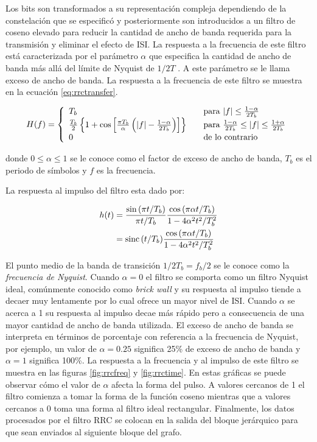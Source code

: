 Los bits son transformados a su representaci\'on compleja dependiendo de la constelaci\'on que se
especific\'o y posteriormente son introducidos a un filtro de coseno elevado para
reducir la cantidad de ancho de banda requerida para la transmisi\'on y eliminar el efecto de ISI. La respuesta a la frecuencia
de este filtro est\'a caracterizada por el par\'ametro $\alpha$ que especifica la cantidad de ancho de banda m\'as all\'a del
l\'imite de Nyquist de $1/2T$ \cite{sklar}. A este par\'ametro se le llama exceso de ancho de banda. La
respuesta a la frecuencia de este filtro se muestra en la ecuaci\'on \eqref{eq:rrctransfer}.

\begin{equation}\label{eq:rrctransfer}
H(f)=\left\{
\begin{array}{l l}
T_b & \quad \text{para $|f| \leq \frac{1-\alpha}{2T_b}$}\\
\frac{T_b}{2}\left\{1+\cos{\left[\frac{\pi
T_b}{\alpha}\left(|f|-\frac{1-\alpha}{2T_b}\right)\right]}\right\} & \quad \text{para
$\frac{1-\alpha}{2T_b} \leq |f| \leq \frac{1+\alpha}{2T_b}$}\\ 0 & \quad \text{de lo contrario} 
\end{array}\right.
\end{equation}

donde $0 \leq \alpha \leq 1$ se le conoce como el factor de exceso de ancho de banda, $T_b$ es el
periodo de s\'imbolos y $f$ es la frecuencia. 

La respuesta al impulso del filtro esta dado por:

\begin{align}\label{eq:imptransfer}
h(t)&=\frac{\sin{(\pi t/T_b)}}{\pi t/T_b}\frac{\cos{(\pi\alpha t/T_b)}}{1-4\alpha^2t^2/T_b^2}
\nonumber \\ 
&=\operatorname{sinc}{(t/T_b)}\frac{\cos{(\pi \alpha t/T_b)}}{1-4\alpha^2t^2/T_b^2}
\end{align}

El punto medio de la banda de transici\'on $1/2T_b=f_b/2$ se le conoce como la \emph{frecuencia de
Nyquist}. Cuando $\alpha=0$ el filtro se comporta como un filtro Nyquist ideal, com\'unmente
conocido como \emph{brick wall} y su respuesta al impulso tiende a decaer muy lentamente por lo
cual ofrece un mayor nivel de ISI. Cuando $\alpha$ se acerca a 1 su respuesta al impulso decae m\'as
r\'apido pero a consecuencia de una mayor cantidad de ancho de banda utilizada. El exceso de ancho
de banda se interpreta en t\'erminos de porcentaje con referencia a la frecuencia de Nyquist, por
ejemplo, un valor de $\alpha=0.25$ significa 25\% de exceso de ancho de banda y $\alpha=1$
significa 100\%. La respuesta a la frecuencia y al impulso de este filtro se muestra en las figuras
\ref{fig:rrcfreq} y \ref{fig:rrctime}. En estas gr\'aficas se puede observar c\'omo el valor de $\alpha$ afecta la forma del
pulso. A valores cercanos de 1 el filtro comienza a tomar la forma de la funci\'on coseno mientras que a valores
cercanos a 0 toma una forma al filtro ideal rectangular. Finalmente, los datos procesados por el filtro RRC se colocan en la
salida del bloque jer\'arquico para que sean enviados al siguiente bloque del grafo.


